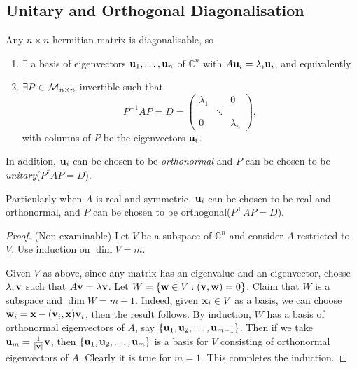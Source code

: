 \documentclass[10pt]{article}
\begin{document}
    \subsection{Unitary and Orthogonal Diagonalisation}
    \begin{theorem}\label{thm:all hermitians are diag}
        Any $n\times n$ hermitian matrix is diagonalisable, so 
        \begin{enumerate}
            \item $ \exists $ a basis of eigenvectors $ {\bf u}_1,\dots,{\bf u}_n $ of $ \mathbb{C}^{n} $ with $ A{\bf u}_i=\lambda_i{\bf u}_i $, and equivalently 
            \item $ \exists P\in {\mathcal{M}}_{n\times n} $ invertible such that 
            \[
                P^{-1}AP=D=\begin{pmatrix}
                    \lambda_1&&0\\
                    &\ddots&\\
                    0&&\lambda_n
                \end{pmatrix},
            \]
            with columns of $P$ be the eigenvectors ${\bf u}_i$.
        \end{enumerate}
        In addition, ${\bf u}_i$ can be chosen to be \textit{orthonormal} and $P$ can be chosen to be \textit{unitary}($ P^\dagger AP=D $).

        Particularly when $A$ is real and symmetric, $ {\bf u}_i $ can be chosen to be real and orthonormal, and $P$ can be chosen to be orthogonal($ P^{\top}AP=D $).
    \end{theorem}
    \begin{proof}(Non-examinable)
        Let $V$ be a subspace of $ \mathbb{C}^{n} $ and consider $A$ restricted to $V$. Use induction on $\dim V=m$.

        Given $V$ as above, since any matrix has an eigenvalue and an eigenvector, chosse $ \lambda,{\bf v} $ such that $ A{\bf v}=\lambda{\bf v} $. Let $ W = \{{\bf w}\in V: ({\bf v},{\bf w})=0\} $. Claim that $W$ is a subspace and $\dim W=m-1$. Indeed, given $ {\bf x}_i\in V $ as a basis, we can choose $ {\bf w}_i={\bf x}-({\bf v}_i,{\bf x}){\bf v}_i $, then the result follows. By induction, $W$ has a basis of orthonormal eigenvectors of $A$, say $ \{{\bf u}_1,{\bf u}_2,\dots,{\bf u}_{m-1}\} $. Then if we take $ {\bf u}_m = \frac{1}{|{\bf v}|}{\bf v} $, then $\{{\bf u}_1,{\bf u}_2,\dots,{\bf u}_{m}\}$ is a basis for $V$ consisting of orthonormal eigenvectors of $A$. Clearly it is true for $m=1$. This completes the induction.
    \end{proof}
\end{document}
